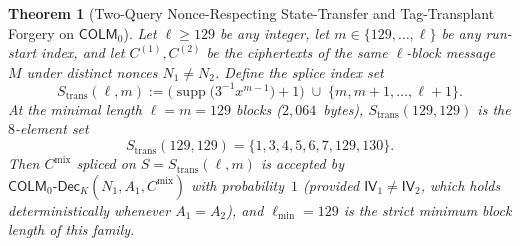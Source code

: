 \documentclass[11pt,a4paper]{article}
\newtheorem{theorem}{Theorem}
\theoremstyle{definition}
\theoremstyle{remark}
\newcommand{\COLMzero}{\mathsf{COLM}_0}
\newcommand{\IV}{\mathsf{IV}}
\newcommand{\supp}{\operatorname{supp}}
\begin{document}
\begin{theorem}[Two-Query Nonce-Respecting State-Transfer and Tag-Transplant Forgery on $\COLMzero$]
\label{thm:transplant}
Let $\ell \ge 129$ be any integer, let $m \in \{129, \dots, \ell\}$ be any run-start index, and let $C^{(1)}, C^{(2)}$ be the ciphertexts of the same $\ell$-block message $M$ under distinct nonces $N_1 \neq N_2$. Define the splice index set
\begin{equation}
\label{eq:S-transplant}
S_{\mathrm{trans}}(\ell, m) := \Big(\supp\big(3^{-1} x^{m-1}\big) + 1\Big) \;\cup\; \{m, m + 1, \dots, \ell + 1\}.
\end{equation}
At the minimal length $\ell = m = 129$ blocks ($2{,}064$~bytes), $S_{\mathrm{trans}}(129, 129)$ is the $8$-element set
\begin{equation}
\label{eq:S-trans-129}
S_{\mathrm{trans}}(129, 129) = \{1, 3, 4, 5, 6, 7, 129, 130\}.
\end{equation}
Then $C^{\mathrm{mix}}$ spliced on $S = S_{\mathrm{trans}}(\ell, m)$ is accepted by $\mathsf{COLM}_0\text{-}\mathsf{Dec}_K(N_1, A_1, C^{\mathrm{mix}})$ with probability~$1$ (provided $\IV_1 \neq \IV_2$, which holds deterministically whenever $A_1 = A_2$), and $\ell_{\min} = 129$ is the strict minimum block length of this family.
\end{theorem}
\end{document}
